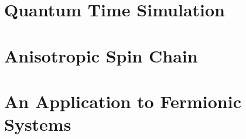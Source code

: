 \documentclass[12pt,twoside]{report}
\begin{document}
  \chapter{Quantum Time Simulation}
  
  \chapter{Anisotropic Spin Chain}
  
  \chapter{An Application to Fermionic Systems}
  
  \printbibliography
\end{document}
